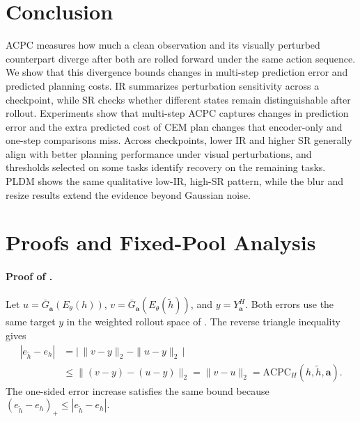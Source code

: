 \documentclass[10pt]{article}
\begin{document}
\section{Conclusion}\label{sec:conc}

ACPC measures how much a clean observation and its visually perturbed
counterpart diverge after both are rolled forward under the same action
sequence. We show that this divergence bounds changes in multi-step prediction
error and predicted planning costs. IR summarizes perturbation sensitivity
across a checkpoint, while SR checks whether different states remain
distinguishable after rollout. Experiments show that multi-step ACPC captures
changes in prediction error and the extra predicted cost of CEM plan changes
that encoder-only and one-step comparisons miss. Across checkpoints, lower IR
and higher SR generally align with better planning performance under visual
perturbations, and thresholds selected on some tasks identify recovery on the
remaining tasks. PLDM shows the same qualitative low-IR, high-SR pattern,
while the blur and resize results extend the evidence beyond Gaussian noise.



\FloatBarrier
\appendix
\section{Proofs and Fixed-Pool Analysis}\label{sec:appendix-acpc-proofs}

\paragraph{Proof of .}
Let $u=\bar G_{\mathbf a}(E_\theta(h))$,
$v=\bar G_{\mathbf a}(E_\theta(\tilde h))$, and $y=Y_{\mathbf a}^H$. Both
errors use the same target $y$ in the weighted rollout space of
. The reverse triangle inequality gives
\begin{align}
|e_{\tilde h}-e_h|
&=\bigl|\,\|v-y\|_2-\|u-y\|_2\,\bigr| \\
&\le \|(v-y)-(u-y)\|_2
=\|v-u\|_2
=\mathrm{ACPC}_H(h,\tilde h,\mathbf a).
\end{align}
The one-sided error increase satisfies the same bound because
$(e_{\tilde h}-e_h)_+\le|e_{\tilde h}-e_h|$.
\end{document}
